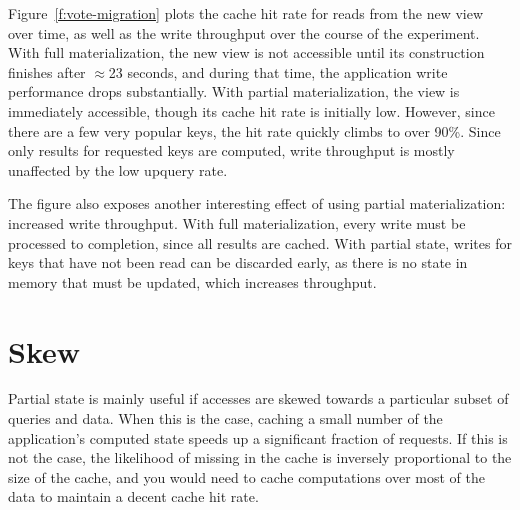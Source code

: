 Figure~\ref{f:vote-migration} plots the cache hit rate for reads from the new
view over time, as well as the write throughput over the course of the
experiment. With full materialization, the new view is not accessible until its
construction finishes after $\approx$23 seconds, and during that time, the
application write performance drops substantially. With partial materialization,
the view is immediately accessible, though its cache hit rate is initially low.
However, since there are a few very popular keys, the hit rate quickly climbs to
over 90\%. Since only results for requested keys are computed, write throughput
is mostly unaffected by the low upquery rate.

The figure also exposes another interesting effect of using partial
materialization: increased write throughput. With full materialization, every
write must be processed to completion, since all results are cached. With
partial state, writes for keys that have not been read can be discarded early,
as there is no state in memory that must be updated, which increases throughput.

% 

\section{Skew}
\label{s:eval:patterns}

Partial state is mainly useful if accesses are skewed towards a particular
subset of queries and data. When this is the case, caching a small number of the
application's computed state speeds up a significant fraction of requests. If
this is not the case, the likelihood of missing in the cache is inversely
proportional to the size of the cache, and you would need to cache computations
over most of the data to maintain a decent cache hit rate.

